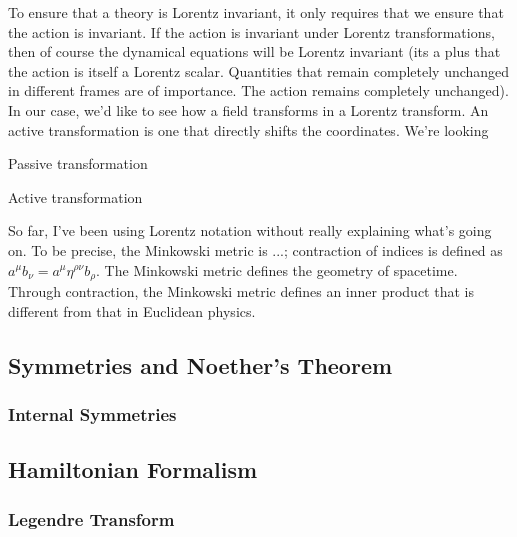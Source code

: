 To ensure that a theory is Lorentz invariant, it only requires that we ensure that the action is invariant. If the action is invariant under Lorentz transformations, then of course the dynamical equations will be Lorentz invariant (its a plus that the action is itself a Lorentz scalar. Quantities that remain completely unchanged in different frames are of importance. The action remains completely unchanged). In our case, we'd like to see how a field transforms in a Lorentz transform. An active transformation is one that directly shifts the coordinates. We're looking 

Passive transformation

Active transformation



So far, I've been using Lorentz notation without really explaining what's going on. To be precise, the Minkowski metric is ...; contraction of indices is defined as $a^\mu b_\nu = a^\mu \eta^{\rho\nu}b_\rho$. The Minkowski metric defines the geometry of spacetime. Through contraction, the Minkowski metric defines an inner product that is different from that in Euclidean physics.
\subsection{Symmetries and Noether's Theorem}
\subsubsection{Internal Symmetries}
\subsection{Hamiltonian Formalism}
\subsubsection{Legendre Transform}
\subsubsection{}
 